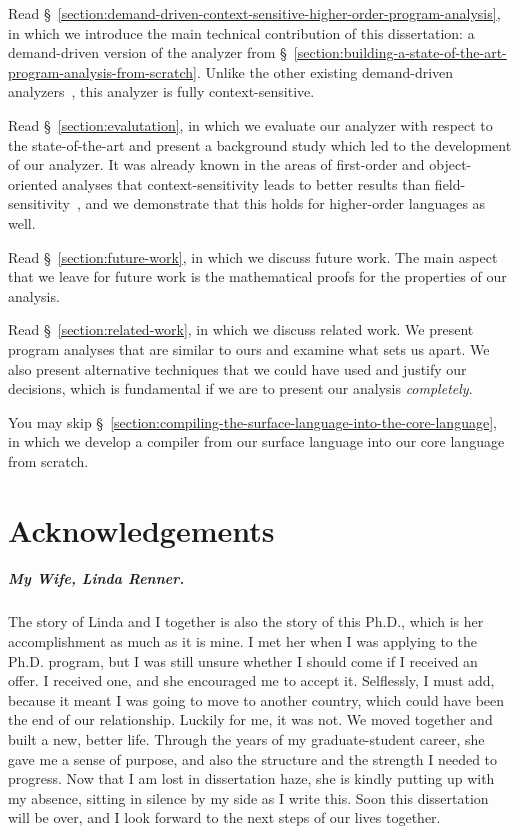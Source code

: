 \documentclass[12pt, oneside]{book}
\begin{document}
Read §~\ref{section:demand-driven-context-sensitive-higher-order-program-analysis}, in which we introduce the main technical contribution of this dissertation: a demand-driven version of the analyzer from §~\ref{section:building-a-state-of-the-art-program-analysis-from-scratch}. Unlike the other existing demand-driven analyzers~\cite{ecoop-16, toplas,  demand-0cfa}, this analyzer is fully context-sensitive.

Read §~\ref{section:evalutation}, in which we evaluate our analyzer with respect to the state-of-the-art and present a background study which led to the development of our analyzer. It was already known in the areas of first-order and object-oriented analyses that context-sensitivity leads to better results than field-sensitivity~\cite{lcl}, and we demonstrate that this holds for higher-order languages as well.

Read §~\ref{section:future-work}, in which we discuss future work. The main aspect that we leave for future work is the mathematical proofs for the properties of our analysis.

Read §~\ref{section:related-work}, in which we discuss related work. We present program analyses that are similar to ours and examine what sets us apart. We also present alternative techniques that we could have used and justify our decisions, which is fundamental if we are to present our analysis \emph{completely}.

You may skip §~\ref{section:compiling-the-surface-language-into-the-core-language}, in which we develop a compiler from our surface language into our core language from scratch.

\chapter{Acknowledgements}

\paragraph{My Wife, Linda Renner.}

The story of Linda and I together is also the story of this Ph.D., which is her accomplishment as much as it is mine. I met her when I was applying to the Ph.D. program, but I was still unsure whether I should come if I received an offer. I received one, and she encouraged me to accept it. Selflessly, I must add, because it meant I was going to move to another country, which could have been the end of our relationship. Luckily for me, it was not. We moved together and built a new, better life. Through the years of my graduate-student career, she gave me a sense of purpose, and also the structure and the strength I needed to progress. Now that I am lost in dissertation haze, she is kindly putting up with my absence, sitting in silence by my side as I write this. Soon this dissertation will be over, and I look forward to the next steps of our lives together.
\end{document}
